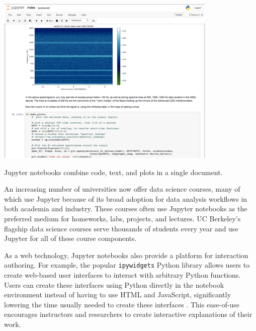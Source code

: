 \documentclass[nobib]{tufte-handout}
\newcommand{\code}[1]{\texttt{#1}}
\begin{document}
\begin{marginfigure}%
  \includegraphics[width=\linewidth]{graphics/jupyter.png}
  \caption{Jupyter notebooks combine code, text, and plots in a single
  document.}
  \label{fig:jupyter}
\end{marginfigure}

An increasing number of universities now offer data science courses, many of
which use Jupyter because of its broad adoption for data analysis workflows in
both academia and industry. These courses often use Jupyter notebooks as the
preferred medium for homeworks, labs, projects, and lectures. UC Berkeley's
flagship data science courses serve thousands of students every year and use
Jupyter for all of these course components.

As a web technology, Jupyter notebooks also provide a platform for interaction
authoring. For example, the popular \code{ipywidgets} Python library allows
users to create web-based user interfaces to interact with arbitrary Python
functions. Users can create these interfaces using Python directly in the
notebook environment instead of having to use HTML and JavaScript,
significantly lowering the time usually needed to create these interfaces
\cite{_jupyter-widgets/ipywidgets_}. This ease-of-use encourages instructors
and researchers to create interactive explanations of their work.
\end{document}
